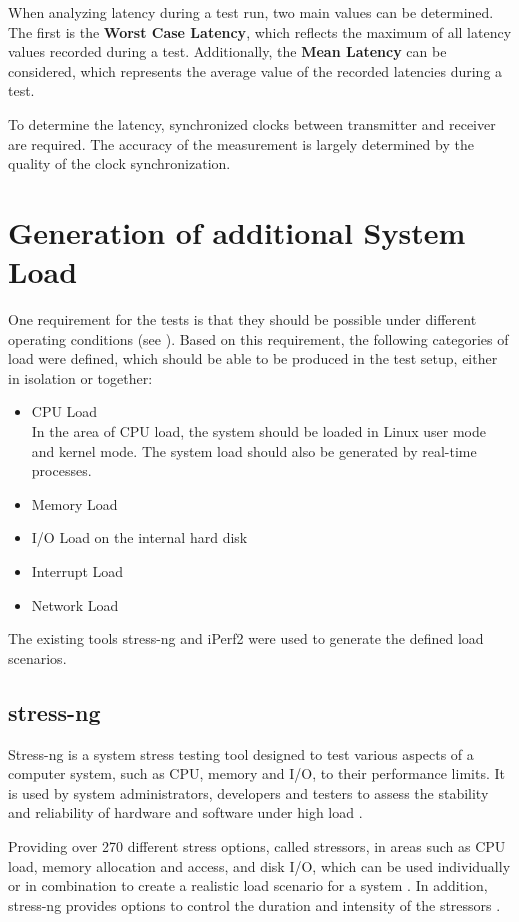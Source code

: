 When analyzing latency during a test run, two main values can be determined. The first is the \textbf{Worst Case Latency}, which reflects the maximum of all latency values recorded during a test. Additionally, the \textbf{Mean Latency} can be considered, which represents the average value of the recorded latencies during a test.

To determine the latency, synchronized clocks between transmitter and receiver are required. The accuracy of the measurement is largely determined by the quality of the clock synchronization.

\section{Generation of additional System Load} \label{chap:loadgeneration}
One requirement for the tests is that they should be possible under different operating conditions (see \label{chap:introduction:research_questions}). Based on this requirement, the following categories of load were defined, which should be able to be produced in the test setup, either in isolation or together:
\begin{itemize}
	\item CPU Load \\
		In the area of CPU load, the system should be loaded in Linux user mode and kernel mode. The system load should also be generated by real-time processes.
	\item Memory Load
	\item I/O Load on the internal hard disk
	\item Interrupt Load
	\item Network Load
\end{itemize}

The existing tools stress-ng and iPerf2 were used to generate the defined load scenarios.

\subsection{stress-ng} 
Stress-ng is a  system stress testing tool designed to test various aspects of a computer system, such as CPU, memory and I/O, to their performance limits. It is used by system administrators, developers and testers to assess the stability and reliability of hardware and software under high load \cite{stress01}.

Providing over 270 different stress options, called stressors, in areas such as CPU load, memory allocation and access, and disk I/O, which can be used individually or in combination to create a realistic load scenario for a system \cite{stress02}. In addition, stress-ng provides options to control the duration and intensity of the stressors \cite{stress03}.


